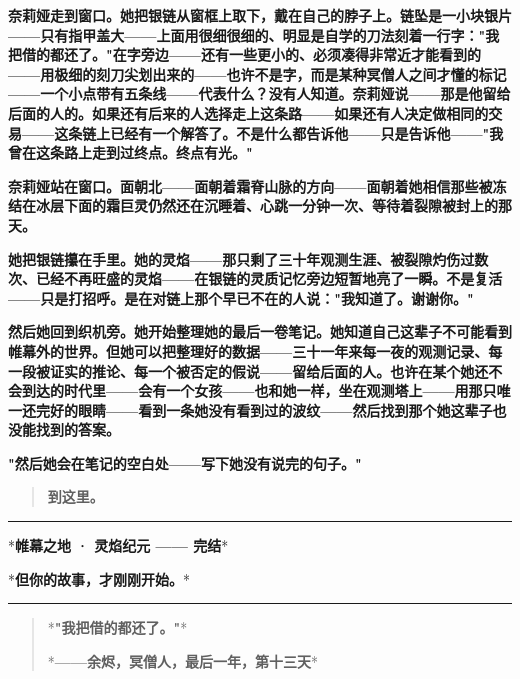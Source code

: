 \documentclass[12pt,a4paper,openany]{ctexbook}
\begin{document}
\textbf{奈莉娅走到窗口。她把银链从窗框上取下，戴在自己的脖子上。链坠是一小块银片——只有指甲盖大——上面用很细很细的、明显是自学的刀法刻着一行字："我把借的都还了。"在字旁边——还有一些更小的、必须凑得非常近才能看到的——用极细的刻刀尖划出来的——也许不是字，而是某种冥僧人之间才懂的标记——一个小点带有五条线——代表什么？没有人知道。奈莉娅说——那是他留给后面的人的。如果还有后来的人选择走上这条路——如果还有人决定做相同的交易——这条链上已经有一个解答了。不是什么都告诉他——只是告诉他——"我曾在这条路上走到过终点。终点有光。"}


\textbf{奈莉娅站在窗口。面朝北——面朝着霜脊山脉的方向——面朝着她相信那些被冻结在冰层下面的霜巨灵仍然还在沉睡着、心跳一分钟一次、等待着裂隙被封上的那天。}


\textbf{她把银链攥在手里。她的灵焰——那只剩了三十年观测生涯、被裂隙灼伤过数次、已经不再旺盛的灵焰——在银链的灵质记忆旁边短暂地亮了一瞬。不是复活——只是打招呼。是在对链上那个早已不在的人说："我知道了。谢谢你。"}


\textbf{然后她回到织机旁。她开始整理她的最后一卷笔记。她知道自己这辈子不可能看到帷幕外的世界。但她可以把整理好的数据——三十一年来每一夜的观测记录、每一段被证实的推论、每一个被否定的假说——留给后面的人。也许在某个她还不会到达的时代里——会有一个女孩——也和她一样，坐在观测塔上——用那只唯一还完好的眼睛——看到一条她没有看到过的波纹——然后找到那个她这辈子也没能找到的答案。}


\textbf{"然后她会在笔记的空白处——写下她没有说完的句子。"}


\begin{quote}
\textbf{到这里。}

\end{quote}


\bigskip\hrule\bigskip


*\textbf{帷幕之地 · 灵焰纪元 —— 完结}*


*\textbf{但你的故事，才刚刚开始。}*


\bigskip\hrule\bigskip


\begin{quote}
*\textbf{"我把借的都还了。"}*

*\textbf{——余烬，冥僧人，最后一年，第十三天}*

\end{quote}
\end{document}
